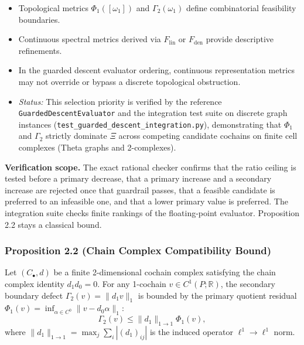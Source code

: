 \documentclass[
  10pt,
]{article}
\begin{document}
\begin{itemize}
\item
  Topological metrics \protect\hypertarget{math-E0014-0006}{}{\(\Phi_1([\omega_1])\)} and \protect\hypertarget{math-E0015-0007}{}{\(\Gamma_2(\omega_1)\)} define combinatorial feasibility boundaries.
\item
  Continuous spectral metrics derived via \protect\hypertarget{math-E0004-0008}{}{\(F_{\mathrm{lin}}\)} or \protect\hypertarget{math-E0003-0009}{}{\(F_{\mathrm{den}}\)} provide descriptive refinements.
\item
  In the guarded descent evaluator ordering, continuous representation metrics may not override or bypass a discrete topological obstruction.
\item
  \emph{Status:} This selection priority is verified by the reference \texttt{GuardedDescentEvaluator} and the integration test suite on discrete graph instances (\texttt{test\_guarded\_descent\_integration.py}), demonstrating that \protect\hypertarget{math-E0007-0010}{}{\(\Phi_1\)} and \protect\hypertarget{math-E0008-0011}{}{\(\Gamma_2\)} strictly dominate \protect\hypertarget{math-E0002-0012}{}{\(\Xi\)} across competing candidate cochains on finite cell complexes (Theta graphs and 2-complexes).
\end{itemize}

\textbf{Verification scope.} The exact rational checker confirms that the ratio ceiling is tested before a primary decrease, that a primary increase and a secondary increase are rejected once that guardrail passes, that a feasible candidate is preferred to an infeasible one, and that a lower primary value is preferred. The integration suite checks finite rankings of the floating-point evaluator. Proposition 2.2 stays a classical bound.

\subsubsection{Proposition 2.2 (Chain Complex Compatibility Bound)}\label{proposition-2.2-chain-complex-compatibility-bound}

Let \protect\hypertarget{math-E0016-0013}{}{\((C_\bullet, d)\)} be a finite 2-dimensional cochain complex satisfying the chain complex identity \protect\hypertarget{math-E0017-0014}{}{\(d_1 d_0 = 0\)}. For any 1-cochain \protect\hypertarget{math-E0018-0015}{}{\(v \in C^1(P; \mathbb{R})\)}, the secondary boundary defect \protect\hypertarget{math-E0019-0016}{}{\(\Gamma_2(v) = \|d_1 v\|_1\)} is bounded by the primary quotient residual \protect\hypertarget{math-E0020-0017}{}{\(\Phi_1(v) = \inf_{\alpha \in C^0} \|v - d_0 \alpha\|_1\)}: \protect\hypertarget{math-E0021-0018}{}{\[\boxed{\Gamma_2(v) \le \|d_1\|_{1\to 1} \Phi_1(v)},\]} where \protect\hypertarget{math-E0022-0019}{}{\(\|d_1\|_{1\to 1} = \max_j \sum_i |(d_1)_{ij}|\)} is the induced operator \protect\hypertarget{math-E0023-0020}{}{\(\ell^1 \to \ell^1\)} norm.
\end{document}
